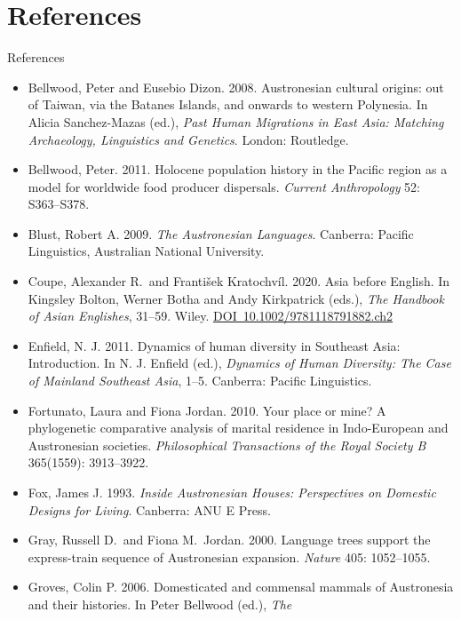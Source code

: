 \documentclass{beamer}
\begin{document}
\section*{References}

\begin{frame}[allowframebreaks]{References}
  \small
  \begin{itemize}\itemsep0.35ex
  \item Bellwood, Peter and Eusebio Dizon. 2008. Austronesian cultural
    origins: out of Taiwan, via the Batanes Islands, and onwards to western
    Polynesia. In Alicia Sanchez-Mazas (ed.), \textit{Past Human Migrations
      in East Asia: Matching Archaeology, Linguistics and Genetics}. London:
    Routledge.
  \item Bellwood, Peter. 2011. Holocene population history in the Pacific
    region as a model for worldwide food producer dispersals.
    \textit{Current Anthropology} 52: S363--S378.
  \item Blust, Robert A. 2009. \textit{The Austronesian Languages}. Canberra:
    Pacific Linguistics, Australian National University.
  \item Coupe, Alexander R.\ and František Kratochvíl. 2020. Asia before
    English. In Kingsley Bolton, Werner Botha and Andy Kirkpatrick (eds.),
    \textit{The Handbook of Asian Englishes}, 31--59. Wiley.
    \href{https://doi.org/10.1002/9781118791882.ch2}{DOI~10.1002/9781118791882.ch2}
  \item Enfield, N. J. 2011. Dynamics of human diversity in Southeast Asia:
    Introduction. In N. J. Enfield (ed.), \textit{Dynamics of Human Diversity:
    The Case of Mainland Southeast Asia}, 1--5. Canberra: Pacific Linguistics.
  \item Fortunato, Laura and Fiona Jordan. 2010. Your place or mine? A
    phylogenetic comparative analysis of marital residence in Indo-European
    and Austronesian societies. \textit{Philosophical Transactions of the
      Royal Society B} 365(1559): 3913--3922.
  \item Fox, James J. 1993. \textit{Inside Austronesian Houses: Perspectives
      on Domestic Designs for Living}. Canberra: ANU E Press.
  \item Gray, Russell D.\ and Fiona M.\ Jordan. 2000. Language trees support
    the express-train sequence of Austronesian expansion. \textit{Nature}
    405: 1052--1055.
  \item Groves, Colin P. 2006. Domesticated and commensal mammals of
    Austronesia and their histories. In Peter Bellwood (ed.), \textit{The
}
\end{itemize}
\end{frame}
\end{document}
